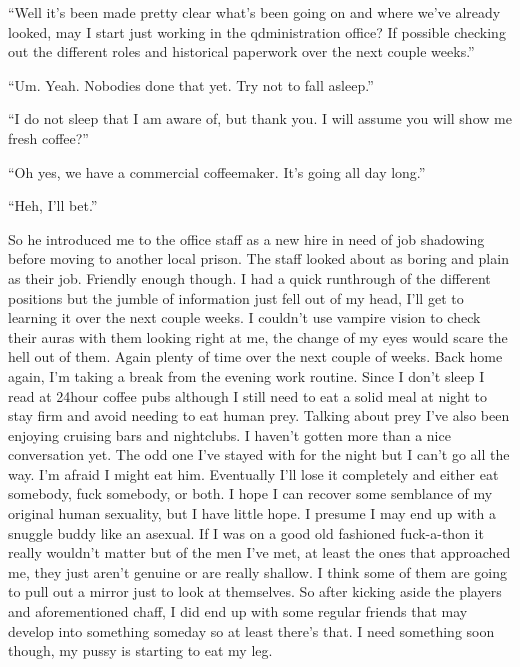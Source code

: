 ``Well it's been made pretty clear what's been going on and where we've already looked, may I start just working in the qdministration office? If possible checking out the different roles and historical paperwork over the next couple weeks.''

``Um. Yeah. Nobodies done that yet. Try not to fall asleep.''

``I do not sleep that I am aware of, but thank you. I will assume you will show me fresh coffee?''

``Oh yes, we have a commercial coffeemaker. It's going all day long.''

``Heh, I'll bet.''

So he introduced me to the office staff as a new hire in need of job shadowing before moving to another local prison. The staff looked about as boring and plain as their job. Friendly enough though. I had a quick runthrough of the different positions  but the jumble of information just fell out of my head, I'll get to learning it over the next couple weeks. I couldn't use vampire vision to check their auras with them looking right at me, the change of my eyes would scare the hell out of them. Again plenty of time over the next couple of weeks.
Back home again, I'm taking a break from the evening work routine. Since I don't sleep I read at 24hour coffee pubs although I still need to eat a solid meal at night to stay firm and avoid needing to eat human prey. Talking about prey I've also been enjoying cruising bars and nightclubs. I haven't gotten more than a nice conversation yet. The odd one I've stayed with for the night but I can't go all the way. I'm afraid I might eat him. Eventually I'll lose it completely and either eat somebody, fuck somebody, or both. I hope I can recover some semblance of my original human sexuality, but I have little hope. I presume I may end up with a snuggle buddy like an asexual. If I was on a good old fashioned fuck-a-thon it really wouldn't matter but of the men I've met, at least the ones that approached me, they just aren't genuine or are really shallow. I think some of them are going to pull out a mirror just to look at themselves. So after kicking aside the players and aforementioned chaff, I did end up with some regular friends that may develop into something someday so at least there's that. I need something soon though, my pussy is starting to eat my leg.

